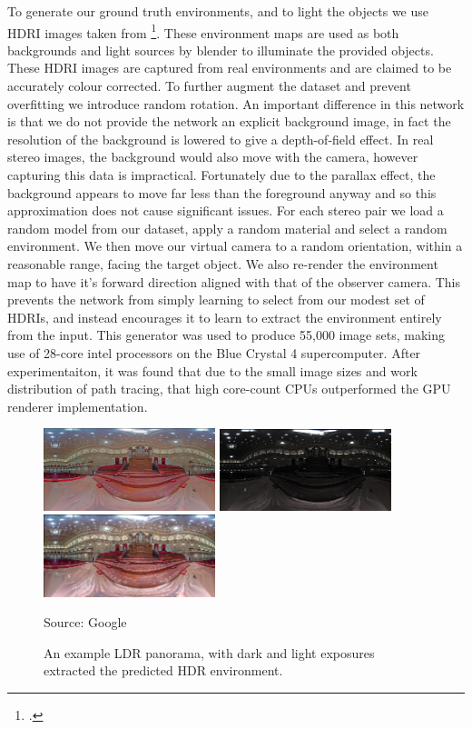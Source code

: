 \documentclass[ %
                    author={Gavin Parker},
                supervisor={Dr. Neill Campbell},
                    degree={MEng},
                     title={Deep Siamese Networks for Illumination Estimation from Stereo Images},
                  subtitle={},
                      type={research},
                      year={2018} ]{dissertation}
\begin{document}
\newline
To generate our ground truth environments, and to light the objects we use HDRI images taken from \footcite{https://hdrihaven.com/}. These environment maps are used as both backgrounds and light sources by blender to illuminate the provided objects. These HDRI images are captured from real environments and are claimed to be accurately colour corrected. To further augment the dataset and prevent overfitting we introduce random rotation. An important difference in this network is that we do not provide the network an explicit background image, in fact the resolution of the background is lowered to give a depth-of-field effect. In real stereo images, the background would also move with the camera, however capturing this data is impractical. Fortunately due to the parallax effect, the background appears to move far less than the foreground anyway and so this approximation does not cause significant issues. For each stereo pair we load a random model from our dataset, apply a random material and select a random environment. We then move our virtual camera to a random orientation, within a reasonable range, facing the target object. We also re-render the environment map to have it's forward direction aligned with that of the observer camera.  This prevents the network from simply learning to select from our modest set of HDRIs, and instead encourages it to learn to extract the environment entirely from the input. This generator was used to produce 55,000 image sets, making use of 28-core intel processors on the Blue Crystal 4 supercomputer. After experimentaiton, it was found that due to the small image sizes and work distribution of path tracing, that high core-count CPUs outperformed the GPU renderer implementation.
\begin{figure}
\center
\includegraphics[width=5cm]{images/google_example/original}
\includegraphics[width=5cm]{images/google_example/dark}
\includegraphics[width=5cm]{images/google_example/bright}
\caption{An example LDR panorama, with dark and light exposures extracted the predicted HDR environment.}\label{fig:google}
Source: Google
\end{figure}
\end{document}
